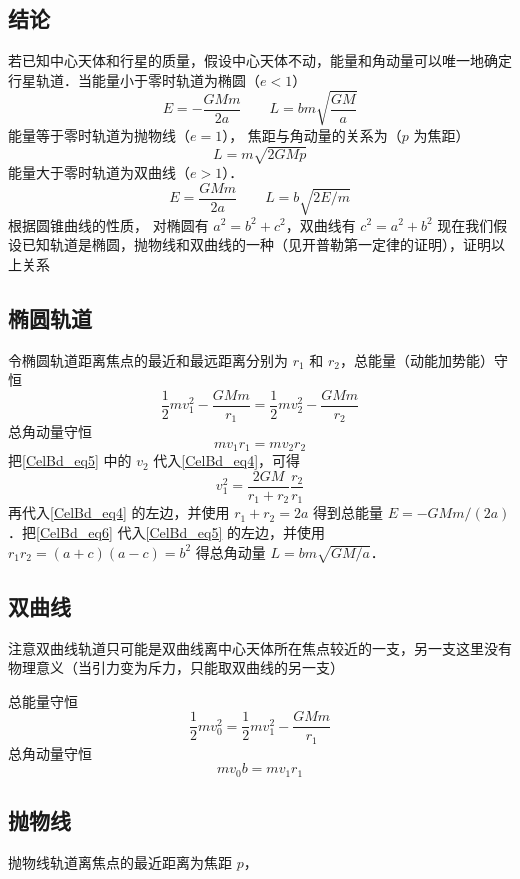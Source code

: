 

\subsection{结论}
若已知中心天体和行星的质量，假设中心天体不动，能量和角动量可以唯一地确定行星轨道．当能量小于零时轨道为椭圆（$e<1$）
\begin{equation}
E=-\frac{GMm}{2a} \qquad  L = bm \sqrt{\frac{GM}{a}}
\end{equation}
能量等于零时轨道为抛物线（$e=1$）， 焦距与角动量的关系为（$p$ 为焦距）
\begin{equation}
L = m \sqrt{2GMp}
\end{equation}
能量大于零时轨道为双曲线（$e>1$）．
\begin{equation}
E=\frac{GMm}{2a}  \qquad  L = b \sqrt{2E/m}
\end{equation}
根据圆锥曲线的性质， 对椭圆有 $a^2=b^2+c^2$，双曲线有 $c^2=a^2+b^2$
现在我们假设已知轨道是椭圆，抛物线和双曲线的一种（见开普勒第一定律的证明），证明以上关系

\subsection{椭圆轨道}
令椭圆轨道距离焦点的最近和最远距离分别为 $r_1$ 和 $r_2$，总能量（动能加势能）守恒
\begin{equation}\label{CelBd_eq4}
\frac12 m v_1^2 - \frac{GMm}{r_1} = \frac12 mv_2^2 - \frac{GMm}{r_2}
\end{equation}
总角动量守恒
\begin{equation}\label{CelBd_eq5}
mv_1 r_1 = mv_2 r_2
\end{equation}
把\autoref{CelBd_eq5} 中的 $v_2$ 代入\autoref{CelBd_eq4}，可得
\begin{equation}\label{CelBd_eq6}
v_1^2 = \frac{2GM}{r_1 + r_2} \frac{r_2}{r_1}
\end{equation}
再代入\autoref{CelBd_eq4} 的左边，并使用 $r_1+r_2=2a$ %
得到总能量 $E=-GMm/(2a)$．把\autoref{CelBd_eq6} 代入\autoref{CelBd_eq5} 的左边，并使用 $r_1 r_2 = (a+c)(a-c) =b^2$ %
得总角动量 $L = bm \sqrt{GM/a}$．

\subsection{双曲线}
注意双曲线轨道只可能是双曲线离中心天体所在焦点较近的一支，另一支这里没有物理意义（当引力变为斥力，只能取双曲线的另一支）

总能量守恒
\begin{equation}
\frac12 mv_0^2 = \frac12 mv_1^2 - \frac{GMm}{r_1}
\end{equation}
总角动量守恒
\begin{equation}
m v_0 b = m v_1 r_1
\end{equation}

\subsection{抛物线}
抛物线轨道离焦点的最近距离为焦距 $p$，

